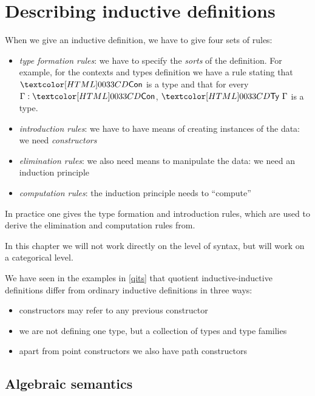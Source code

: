 \chapter{Describing inductive definitions}
\label{describing}

When we give an inductive definition, we have to give four sets of
rules:
\begin{itemize}
\item \emph{type formation rules}: we have to specify the \emph{sorts}
  of the definition. For example, for the contexts and types
  definition we have a rule stating that $\ttconty$ is a type and that
  for every $\Gamma : \ttconty$, $\tttyty\ \Gamma$ is a type.
\item \emph{introduction rules}: we have to have means of creating
  instances of the data: we need \emph{constructors}
\item \emph{elimination rules}: we also need means to manipulate the
  data: we need an induction principle
\item \emph{computation rules}: the induction principle needs to ``compute''
\end{itemize}

In practice one gives the type formation and introduction rules, which
are used to derive the elimination and computation rules from.

In this chapter we will not work directly on the level of syntax, but
will work on a categorical level.

We have seen in the examples in \cref{qits} that quotient
inductive-inductive definitions differ from ordinary inductive
definitions in three ways:
%
\begin{itemize}
\item constructors may refer to any previous constructor
\item we are not defining one type, but a collection of types and type
  families
\item apart from point constructors we also have path constructors
\end{itemize}

\section{Algebraic semantics}

